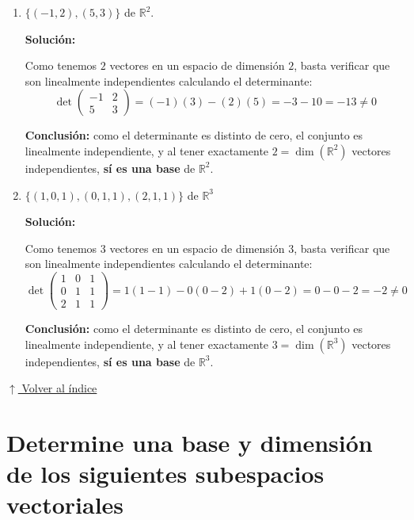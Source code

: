\documentclass[12pt]{article}
\newcommand{\solucion}{%
    \vspace{0.8em}%
    \textbf{Solución:}%
    \vspace{0.8em}%
}
\newcommand{\volverindice}{%
    \vspace{1em}%
    \begin{flushright}%
        \hyperlink{indice}{\small $\uparrow$ Volver al índice}%
    \end{flushright}%
}
\begin{document}
\begin{enumerate}[label=\alph*.-]
    \item $\{(-1,2),(5,3)\}$ de $\mathbb{R}^2$.

    \solucion

    Como tenemos $2$ vectores en un espacio de dimensión $2$, basta verificar que son linealmente independientes calculando el determinante:
    \[
    \det\begin{pmatrix}-1&2\\5&3\end{pmatrix} = (-1)(3)-(2)(5) = -3-10=-13 \neq 0
    \]

    \textbf{Conclusión:} como el determinante es distinto de cero, el conjunto es linealmente independiente, y al tener exactamente $2=\dim(\mathbb{R}^2)$ vectores independientes, \textbf{sí es una base} de $\mathbb{R}^2$.

    \item $\{(1,0,1),(0,1,1),(2,1,1)\}$ de $\mathbb{R}^3$

    \solucion

    Como tenemos $3$ vectores en un espacio de dimensión $3$, basta verificar que son linealmente independientes calculando el determinante:
    \[
    \det\begin{pmatrix}1&0&1\\0&1&1\\2&1&1\end{pmatrix} = 1(1-1)-0(0-2)+1(0-2) = 0-0-2=-2 \neq 0
    \]

    \textbf{Conclusión:} como el determinante es distinto de cero, el conjunto es linealmente independiente, y al tener exactamente $3=\dim(\mathbb{R}^3)$ vectores independientes, \textbf{sí es una base} de $\mathbb{R}^3$.
\end{enumerate}

\volverindice
\newpage

\section{Determine una base y dimensión de los siguientes subespacios vectoriales}
\end{document}

